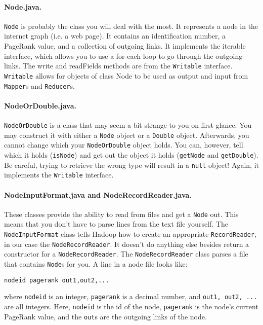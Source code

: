 \documentclass[10pt]{article}
\begin{document}
\paragraph{Node.java.}
\texttt{Node} is probably the class you will deal with the most. It represents a node in the internet graph (i.e. a web page). It contains an identification number, a PageRank value, and a collection of outgoing links. It implements the iterable interface, which allows you to use a for-each loop to go through the outgoing links. The write and readFields methods are from the \texttt{Writable} interface. \texttt{Writable} allows for objects of class Node to be used as output and input from \texttt{Mapper}s and \texttt{Reducer}s.

\paragraph{NodeOrDouble.java.}
\texttt{NodeOrDouble} is a class that may seem a bit strange to you on first glance. You may construct it with either a \texttt{Node} object or a \texttt{Double} object. Afterwards, you cannot change which your \texttt{NodeOrDouble} object holds. You can, however, tell which it holds (\texttt{isNode}) and get out the object it holds (\texttt{getNode} and \texttt{getDouble}). Be careful, trying to retrieve the wrong type will result in a \texttt{null} object! Again, it implements the \texttt{Writable} interface.

\paragraph{NodeInputFormat.java and NodeRecordReader.java.}
These classes provide the ability to read from files and get a \texttt{Node} out. This means that you don't have to parse lines from the text file yourself. The \texttt{NodeInputFormat} class tells Hadoop how to create an appropriate \texttt{RecordReader}, in our case the \texttt{NodeRecordReader}. It doesn't do anything else besides return a constructor for a \texttt{NodeRecordReader}. The \texttt{NodeRecordReader} class parses a file that contains \texttt{Node}s for you.
A line in a node file looks like:
\begin{verbatim}
nodeid pagerank out1,out2,...
\end{verbatim}
where \texttt{nodeid} is an integer, \texttt{pagerank} is a decimal number, and \texttt{out1, out2, ...} are all integers.
 Here, \texttt{nodeid} is the id of the node, \texttt{pagerank} is the node's current PageRank value, and the \texttt{out}s are the outgoing links of the node.
\end{document}
